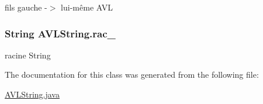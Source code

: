 fils gauche -\/$>$ lui-\/même A\-V\-L \hypertarget{class_a_v_l_string_adb167b91de2f634545354179d75c7a2a}{
\subsubsection[{rac\-\_\-}]{\setlength{\rightskip}{0pt plus 5cm}String A\-V\-L\-String.\-rac\-\_\-\hspace{0.3cm}{\ttfamily [private]}}}\label{class_a_v_l_string_adb167b91de2f634545354179d75c7a2a}
racine String 

The documentation for this class was generated from the following file\-:\begin{DoxyCompactItemize}
\item 
\hyperlink{_a_v_l_string_8java}{A\-V\-L\-String.\-java}\end{DoxyCompactItemize}

